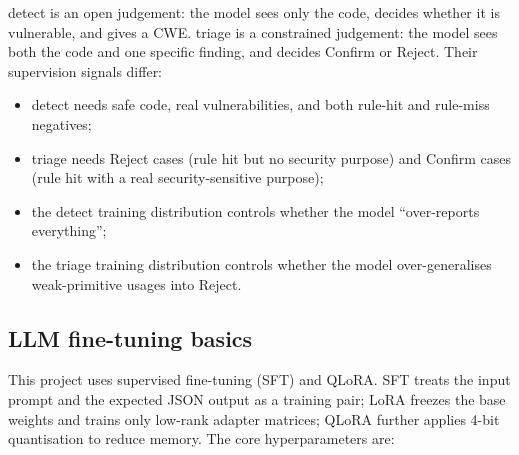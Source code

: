 \documentclass[11pt]{article}
\begin{document}
detect is an open judgement: the model sees only the code, decides whether it is vulnerable, and gives a CWE.
triage is a constrained judgement: the model sees both the code and one specific finding, and decides Confirm
or Reject. Their supervision signals differ:

\begin{itemize}
  \item detect needs safe code, real vulnerabilities, and both rule-hit and rule-miss negatives;
  \item triage needs Reject cases (rule hit but no security purpose) and Confirm cases (rule hit with a real
        security-sensitive purpose);
  \item the detect training distribution controls whether the model ``over-reports everything'';
  \item the triage training distribution controls whether the model over-generalises weak-primitive usages
        into Reject.
\end{itemize}

\subsection{LLM fine-tuning basics}

This project uses supervised fine-tuning (SFT) and QLoRA. SFT treats the input prompt and the expected JSON
output as a training pair; LoRA freezes the base weights and trains only low-rank adapter matrices; QLoRA
further applies 4-bit quantisation to reduce memory. The core hyperparameters are:
\end{document}
